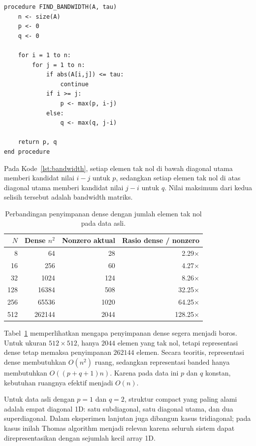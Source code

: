 \documentclass[12pt,a4paper]{article}
\begin{document}
\begin{lstlisting}[style=pseudo,caption={Pseudocode pencarian lower bandwidth $p$ dan upper bandwidth $q$.},label={lst:bandwidth}]
procedure FIND_BANDWIDTH(A, tau)
    n <- size(A)
    p <- 0
    q <- 0

    for i = 1 to n:
        for j = 1 to n:
            if abs(A[i,j]) <= tau:
                continue
            if i >= j:
                p <- max(p, i-j)
            else:
                q <- max(q, j-i)

    return p, q
end procedure
\end{lstlisting}

Pada Kode~\ref{lst:bandwidth}, setiap elemen tak nol di bawah diagonal utama memberi kandidat nilai $i-j$ untuk $p$, sedangkan setiap elemen tak nol di atas diagonal utama memberi kandidat nilai $j-i$ untuk $q$. Nilai maksimum dari kedua selisih tersebut adalah bandwidth matriks.

\begin{table}[h]
\centering
\caption{Perbandingan penyimpanan dense dengan jumlah elemen tak nol pada data asli.}
\label{tab:bandwidth-storage}
\begin{tabular}{rrrr}
\toprule
$N$ & Dense $n^2$ & Nonzero aktual & Rasio dense / nonzero \\
\midrule
8   & 64     & 28   & 2.29$\times$ \\
16  & 256    & 60   & 4.27$\times$ \\
32  & 1024   & 124  & 8.26$\times$ \\
128 & 16384  & 508  & 32.25$\times$ \\
256 & 65536  & 1020 & 64.25$\times$ \\
512 & 262144 & 2044 & 128.25$\times$ \\
\bottomrule
\end{tabular}
\end{table}

Tabel~\ref{tab:bandwidth-storage} memperlihatkan mengapa penyimpanan dense segera menjadi boros. Untuk ukuran $512\times512$, hanya $2044$ elemen yang tak nol, tetapi representasi dense tetap memaksa penyimpanan $262144$ elemen. Secara teoritis, representasi dense membutuhkan $O(n^2)$ ruang, sedangkan representasi banded hanya membutuhkan $O((p+q+1)n)$. Karena pada data ini $p$ dan $q$ konstan, kebutuhan ruangnya efektif menjadi \textbf{$O(n)$}.

Untuk data asli dengan $p=1$ dan $q=2$, struktur compact yang paling alami adalah empat diagonal 1D: satu subdiagonal, satu diagonal utama, dan dua superdiagonal. Dalam eksperimen lanjutan juga dibangun kasus tridiagonal; pada kasus inilah Thomas algorithm menjadi relevan karena seluruh sistem dapat direpresentasikan dengan sejumlah kecil array 1D.
\end{document}
